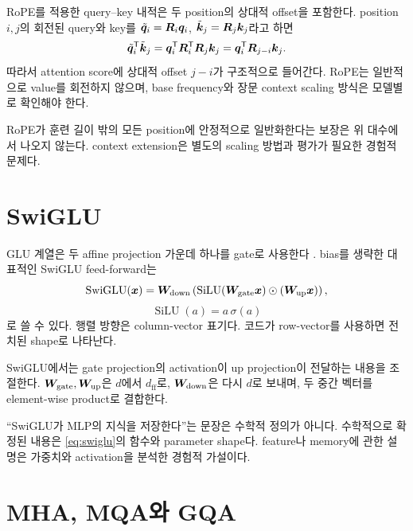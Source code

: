 RoPE를 적용한 query--key 내적은 두 position의 상대적 offset을 포함한다.
position $i,j$의 회전된 query와 key를 $\tilde{\bm{q}}_i=\bm{R}_i\bm{q}_i$, $\tilde{\bm{k}}_j=\bm{R}_j\bm{k}_j$라고 하면
\begin{equation}
  \tilde{\bm{q}}_i^{\mathsf T}\tilde{\bm{k}}_j
  =\bm{q}_i^{\mathsf T}\bm{R}_i^{\mathsf T}\bm{R}_j\bm{k}_j
  =\bm{q}_i^{\mathsf T}\bm{R}_{j-i}\bm{k}_j.
\end{equation}
따라서 attention score에 상대적 offset $j-i$가 구조적으로 들어간다.
RoPE는 일반적으로 value를 회전하지 않으며, base frequency와 장문 context scaling 방식은 모델별로 확인해야 한다.

\begin{limitbox}
RoPE가 훈련 길이 밖의 모든 position에 안정적으로 일반화한다는 보장은 위 대수에서 나오지 않는다.
context extension은 별도의 scaling 방법과 평가가 필요한 경험적 문제다.
\end{limitbox}

\section{SwiGLU}

GLU 계열은 두 affine projection 가운데 하나를 gate로 사용한다 \citep{shazeer2020glu}.
bias를 생략한 대표적인 SwiGLU feed-forward는
\begin{equation}
  \operatorname{SwiGLU}(\bm{x})=
  \bm{W}_{\mathrm{down}}
  \left(\operatorname{SiLU}(\bm{W}_{\mathrm{gate}}\bm{x})
  \odot(\bm{W}_{\mathrm{up}}\bm{x})\right),
  \label{eq:swiglu}
\end{equation}
\begin{equation}
  \operatorname{SiLU}(a)=a\,\sigma(a)
\end{equation}
로 쓸 수 있다.
행렬 방향은 column-vector 표기다.
코드가 row-vector를 사용하면 전치된 shape로 나타난다.

SwiGLU에서는 gate projection의 activation이 up projection이 전달하는 내용을 조절한다.
$\bm{W}_{\mathrm{gate}},\bm{W}_{\mathrm{up}}$은 $d$에서 $d_{\mathrm{ff}}$로, $\bm{W}_{\mathrm{down}}$은 다시 $d$로 보내며, 두 중간 벡터를 element-wise product로 결합한다.

``SwiGLU가 MLP의 지식을 저장한다''는 문장은 수학적 정의가 아니다.
수학적으로 확정된 내용은 \cref{eq:swiglu}의 함수와 parameter shape다.
feature나 memory에 관한 설명은 가중치와 activation을 분석한 경험적 가설이다.

\section{MHA, MQA와 GQA}

